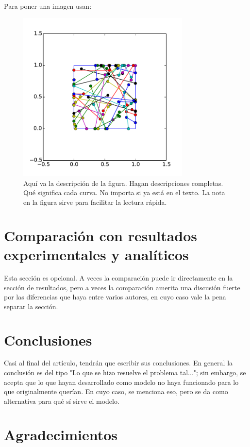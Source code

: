 \documentclass[pre,amsmath,amssymb, twocolumn, showpacs]{revtex4}
\begin{document}
Para poner una imagen usan: 
\begin{figure}
    \centering
    \includegraphics[width=245pt]{fig1.pdf}
    \caption{Aquí va la descripción de la figura. Hagan descripciones completas. Qué significa cada curva. No importa si ya está en el texto. La nota en la figura sirve para facilitar la lectura rápida.}
    \label{fig: figura1}
\end{figure}

\section{Comparación con resultados experimentales y analíticos}

Esta sección es opcional. A veces la comparación puede ir directamente en la sección de resultados, pero a veces la comparación amerita una discusión fuerte por las diferencias que haya entre varios autores, en cuyo caso vale la pena separar la sección. 

\section{Conclusiones}
\label{conclusions}

Casi al final del artículo, tendrán que escribir sus conclusiones. En general la conclusión es del tipo "Lo que se hizo resuelve el problema tal..."; sin embargo, se acepta que lo que hayan desarrollado como modelo no haya funcionado para lo que originalmente querían. En cuyo caso, se menciona eso, pero se da como alternativa para qué sí sirve el modelo. 


\section{Agradecimientos}
\end{document}
